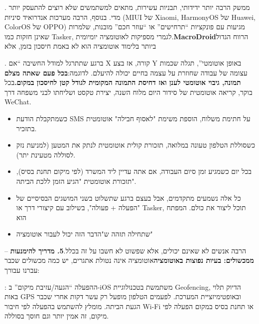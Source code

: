 . ממשק הרבה יותר ידידותי, תבניות עשירות, מתאים למשתמשים שלא רוצים להתעסק יותר מדי. בנוסף, הרבה מערכות אנדרואיד סיניות (MIUI של Xiaomi, HarmonyOS של Huawei, ColorOS של OPPO) מגיעות עם פונקציות “תרחישים” או “עוזר חכם” מובנות, שלמרות שאינן חזקות כמו Tasker, לגמרי מספיקות לאוטומציה יומיומית.\textbf{MacroDroid}הרווח הגדול ביותר בלימוד אוטומציה הוא לא באמת חיסכון בזמן, אלא


. ברגע שתתרגל למודל החשיבה “אם X קורה, אז בצע Y באופן אוטומטי”, תגלה שכמות עצומה של עבודה שחוזרת על עצמה בחיים יכולה להיעלם. לדוגמה:\textbf{בכל פעם שאתה מצלם תמונה, גיבוי אוטומטי לענן ואז דחיסת התמונה המקומית לגודל קטן לחיסכון במקום.}בכל בוקר, קריאה אוטומטית של סידור היום מלוח השנה, יצירת טקסט ושליחתו לבני משפחה דרך WeChat.

\begin{itemize}
  \item כשמתקבלת הודעת SMS על חתימת משלוח, הוספת משימת "לאסוף חבילה" אוטומטית בתזכיר.
  \item כשסוללת הטלפון טעונה במלואה, תזכורת קולית אוטומטית לנתק את המטען (למניעת נזק לסוללה מטעינת יתר).
  \item בכל יום כשמגיע זמן סיום העבודה, אם אתה עדיין ליד המשרד (לפי מיקום תחנת בסיס), תזכורת אוטומטית "הגיע הזמן ללכת הביתה".
  \item כל אלה נשמעים מתקדמים, אבל בעצם ברגע שתשלוט בשני המושגים הבסיסיים של "הפעלה + פעולה", בשילוב עם קיצורי דרך או Tasker, תוכל ליצור את כולם. המפתח הוא
  \item שתחילה תזהה ש"הדבר הזה יכול לעבור אוטומציה"
\end{itemize}

– הרבה אנשים לא שאינם יכולים, אלא שפשוט לא חשבו על זה בכלל.\textbf{5. מדריך להימנעות ממכשולים: בעיות נפוצות באוטומציה}אוטומציה אינה נטולת אתגרים, יש כמה מכשולים שכבר עברנו עבורך:


: ההפעלה “הגעה/עזיבת מיקום” ב-iOS משתמשת בטכנולוגיית Geofencing, הדיוק תלוי באות GPS ובאופטימיזציית המערכת. לפעמים הטלפון מופעל רק עשר דקות אחרי שכבר הגעת הביתה. מומלץ להשתמש בהפעלה לפי חיבור Wi-Fi או תחנת בסיס במקום הפעלה לפי מיקום, זה אמין יותר וגם חוסך בסוללה.

